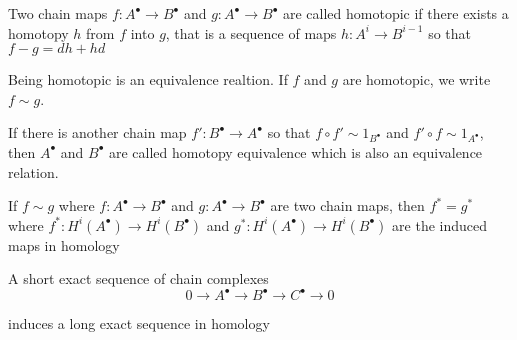 \begin{definition}
	Two chain maps $f: A^\bullet \to B^\bullet$ and $g: A^\bullet \to B^\bullet$ are called homotopic if there exists a homotopy $h$ from $f$ into $g$, that is a sequence of maps $h: A^{i} \to B^{i-1}$ so that $f - g = dh + hd$
	\begin{center}
	\end{center}
	
	Being homotopic is an equivalence realtion. If $f$ and $g$ are homotopic, we write $f \sim g$. 
	
	If there is another chain map $f': B^\bullet \to A^\bullet$ so that $f \circ f' \sim 1_{B^\bullet}$ and $f' \circ f \sim 1_{A^\bullet}$, then $A^\bullet$ and $B^\bullet$ are called homotopy equivalence which is also an equivalence relation.
\end{definition}

\begin{proposition}
	If $f \sim g$ where $f: A^\bullet \to B^\bullet$ and $g: A^\bullet \to B^\bullet$ are two chain maps, then $f^* = g^*$ where $f^*: H^i(A^\bullet) \to H^i(B^\bullet)$ and $g^*: H^i(A^\bullet) \to H^i(B^\bullet)$ are the induced maps in homology
\end{proposition}

\begin{theorem}
	A short exact sequence of chain complexes
	$$
	0 \to A^\bullet \to B^\bullet \to C^\bullet \to 0
	$$
	
	induces a long exact sequence in homology
	
	\begin{center}
	\end{center}
\end{theorem}


